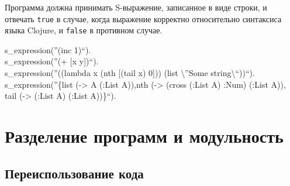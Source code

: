 \begin{frame}

\frametitle{\insertsection}

	Программа должна принимать S-выражение, записанное в виде строки, и отвечать \texttt{true} в случае, когда выражение корректно относительно синтаксиса
	языка Clojure, и \texttt{false} в противном случае.
	
	\begin{rexample}
		s\_expression(''(inc 1)``). \\
		s\_expression(''(+ [x y])``). \\
		s\_expression(''((lambda x (nth [(tail x) 0])) (list \textbackslash''Some string\textbackslash``))``).\\
		s\_expression(''\{list (-> A (:List A)),nth (-> (cross (:List A) :Num) (:List A)), tail (-> (:List A)  (:List A))\}``).
	\end{rexample}

\end{frame}






\section{Разделение программ и модульность}

\begin{frame}

	\begin{center}
		\Huge \insertsection
	\end{center}

\end{frame}

\subsection{Переиспользование кода}

